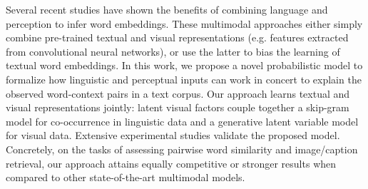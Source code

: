 Several recent studies have shown the benefits of combining language and perception to infer word embeddings. These multimodal approaches either simply combine pre-trained textual and visual representations (e.g. features extracted from convolutional neural networks), or use the latter to bias the learning of textual word embeddings. In this work, we propose a novel probabilistic model to formalize how linguistic and perceptual inputs can work in concert to explain the observed word-context pairs in a text corpus. Our approach learns textual and visual representations jointly: latent visual factors couple together a  skip-gram model for co-occurrence in linguistic data and a generative latent variable model for visual data. Extensive experimental studies validate the proposed model. Concretely, on the tasks of assessing pairwise word similarity and image/caption retrieval, our approach attains equally competitive or stronger results when compared to other state-of-the-art multimodal models.
